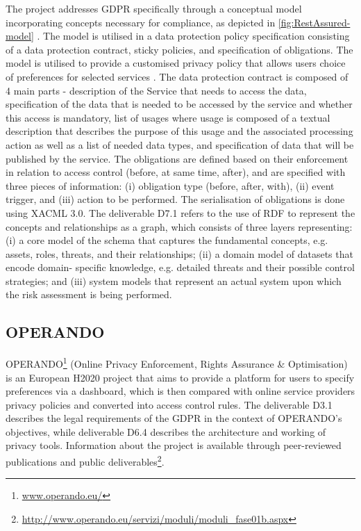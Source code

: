 The project addresses GDPR specifically through a conceptual model incorporating concepts necessary for compliance, as depicted in \autoref{fig:RestAssured-model} \cite{RestAssured_D6.1}. The model is utilised in a data protection policy specification consisting of a data protection contract, sticky policies, and specification of obligations. The model is utilised to provide a customised privacy policy that allows users choice of preferences for selected services \cite{gritzalis_privacy_2019}. The data protection contract is composed of 4 main parts - description of the Service that needs to access the data, specification of the data that is needed to be accessed by the service and whether this access is mandatory, list of usages where usage is composed of a textual description that describes the purpose of this usage and the associated processing action as well as a list of needed data types, and specification of data that will be published by the service.
The obligations are defined based on their enforcement in relation to access control (before, at same time, after), and are specified with three pieces of information: (i) obligation type (before, after, with), (ii) event trigger, and (iii) action to be performed. The serialisation of obligations is done using XACML 3.0.
The deliverable D7.1 \cite{noauthor_d7.1_2018} refers to the use of RDF to represent the concepts and relationships as a graph, which consists of three layers representing: (i) a core model of the schema that captures the fundamental concepts, e.g. assets, roles, threats, and their relationships; (ii) a domain model of datasets that encode domain- specific knowledge, e.g. detailed threats and their possible control strategies; and (iii) system models that represent an actual system upon which the risk assessment is being performed.

\subsection*{OPERANDO}
OPERANDO\footnote{\url{www.operando.eu/}} (Online Privacy Enforcement, Rights Assurance \& Optimisation) is an European H2020 project that aims to provide a platform for users to specify preferences via a dashboard, which is then compared with online service providers privacy policies and converted into access control rules.
The deliverable D3.1 \cite{noauthor_d3.1_2016} describes the legal requirements of the GDPR in the context of OPERANDO's objectives, while deliverable D6.4 \cite{noauthor_d6.4_2017} describes the architecture and working of privacy tools.
Information about the project is available through peer-reviewed publications and public deliverables\footnote{\url{http://www.operando.eu/servizi/moduli/moduli_fase01b.aspx}}.

